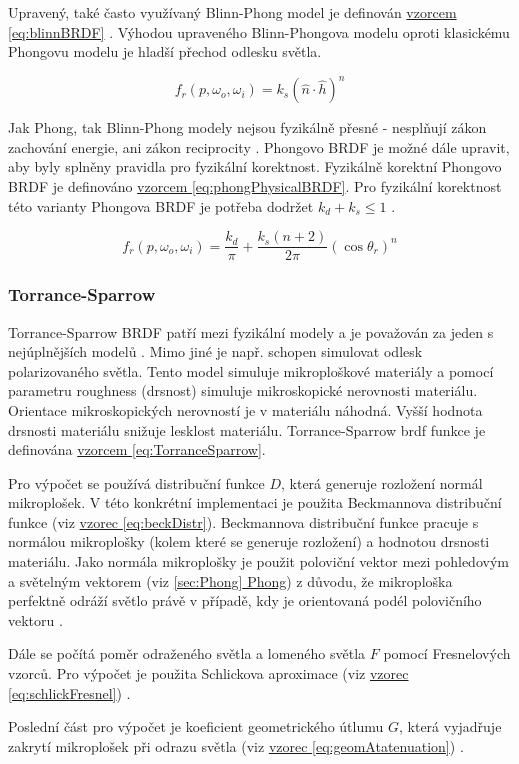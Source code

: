 \documentclass[czech,master,dept460,male,cpp,cpdeclaration]{diploma}
\newcommand{\uvec}[1]{\hat{#1}}
\newcommand{\point}{p}
\newcommand{\brdf}{f_r\left(\point,\omega_{o},\omega_{i}\right)}
\newcommand{\normVec}{\uvec{n}}
\newcommand{\halfVec}{\uvec{h}}
\begin{document}
Upravený, také často využívaný Blinn-Phong model je definován \hyperref[eq:blinnBRDF]{vzorcem \ref{eq:blinnBRDF}} \cite{BlinnPhong1977}. Výhodou upraveného Blinn-Phongova modelu oproti klasickému Phongovu modelu je hladší přechod odlesku světla.

\begin{equation} \label{eq:blinnBRDF}
    \brdf = k_s(\normVec\cdot\halfVec)^n
\end{equation}

Jak Phong, tak Blinn-Phong modely nejsou fyzikálně přesné - nesplňují zákon zachování energie, ani zákon reciprocity \cite{BRDFOverview}. Phongovo BRDF je možné dále upravit, aby byly splněny pravidla pro fyzikální korektnost. Fyzikálně korektní Phongovo BRDF je definováno \hyperref[eq:phongPhysicalBRDF]{vzorcem \ref{eq:phongPhysicalBRDF}}. Pro fyzikální korektnost této varianty Phongova BRDF je potřeba dodržet \(k_d + k_s \leq 1\) \cite{LaFortunePhongBRDF}.

\begin{equation} \label{eq:phongPhysicalBRDF}
    \brdf = \frac{k_d}{\pi} +
    \frac{k_s\left(n+2\right)}{2\pi}\left(\cos\theta_r\right)^n
\end{equation}

\subsubsection{Torrance-Sparrow} \label{sec:torrancesparrow}
Torrance-Sparrow BRDF patří mezi fyzikální modely a je považován za jeden s nejúplnějších modelů \cite{BRDFOverview}. Mimo jiné je např. schopen simulovat odlesk polarizovaného světla. Tento model simuluje mikroploškové materiály a pomocí parametru roughness (drsnost) simuluje mikroskopické nerovnosti materiálu. Orientace mikroskopických nerovností je v materiálu náhodná. Vyšší hodnota drsnosti materiálu snižuje lesklost materiálu. Torrance-Sparrow brdf funkce je definována \hyperref[eq:TorranceSparrow]{vzorcem \ref{eq:TorranceSparrow}}. \par
Pro výpočet se používá distribuční funkce \(D\), která generuje rozložení normál mikroplošek. V této konkrétní implementaci je použita Beckmannova distribuční funkce (viz \hyperref[eq:beckDistr]{vzorec \ref{eq:beckDistr}}). Beckmannova distribuční funkce pracuje s normálou mikroplošky (kolem které se generuje rozložení) a hodnotou drsnosti materiálu. Jako normála mikroplošky je použit poloviční vektor mezi pohledovým a světelným vektorem (viz \hyperref[sec:Phong]{\ref{sec:Phong} Phong}) z důvodu, že mikroploška perfektně odráží světlo právě v případě, kdy je orientovaná podél polovičního vektoru \cite{PHARR2017507}. \par
Dále se počítá poměr odraženého světla a lomeného světla \(F\) pomocí Fresnelových vzorců. Pro výpočet je použita Schlickova aproximace (viz \hyperref[eq:schlickFresnel]{vzorec \ref{eq:schlickFresnel}}) \cite{SchlickFresnel}. \par
Poslední část pro výpočet je koeficient geometrického útlumu \(G\), která vyjadřuje zakrytí mikroplošek při odrazu světla (viz \hyperref[eq:geomAtatenuation]{vzorec \ref{eq:geomAtatenuation}}) \cite{BRDFOverview}.
\end{document}
